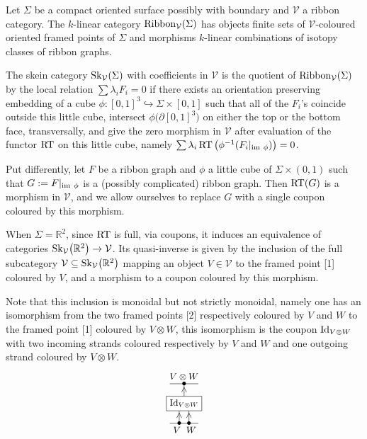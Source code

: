 \documentclass[pdftex]{sigma}%
\numberwithin{equation}{section}
\begin{document}
\begin{Definition}
Let $\Sigma$ be a compact oriented surface possibly with boundary and $\mathcal{V}$ a ribbon category. The $k$-linear category ${\rm Ribbon}_\mathcal{V}(\Sigma)$ has objects finite sets of $\mathcal{V}$-coloured oriented framed points of $\Sigma$ and morphisms $k$-linear combinations of isotopy classes of ribbon graphs.

The skein category ${\rm Sk}_\mathcal{V}(\Sigma)$ with coefficients in $\mathcal{V}$ is the quotient of ${\rm Ribbon}_\mathcal{V}(\Sigma)$ by the local relation $\sum \lambda_i F_i = 0$ if there exists an orientation preserving embedding of a cube $\phi\colon [0,1]^3 \hookrightarrow \Sigma \times [0,1]$ such that all of the $F_i$'s coincide outside this little cube, intersect $\phi\big(\partial [0,1]^3\big)$ on either the top or the bottom face, transversally, and give the zero morphism in $\mathcal{V}$ after evaluation of the functor ${\rm RT}$ on this little cube, namely $\sum \lambda_i \mathop{\rm RT}\big(\phi^{-1}(F_i\vert_{{\rm im}\ \phi})\big) = 0$.

Put differently, let $F$ be a ribbon graph and $\phi$ a little cube of $\Sigma \times (0,1)$ such that $G := F\vert_{{\rm im}\ \phi}$ is a (possibly complicated) ribbon graph. Then $\mathop{\rm RT}(G)$ is a morphism in $\mathcal{V}$, and we allow ourselves to replace $G$ with a single coupon coloured by this morphism.
\end{Definition}

\begin{Remark}\label{rmkInclVtoSkMonoid}
When $\Sigma = \mathbb{R}^2$, since ${\rm RT}$ is full, via coupons, it induces an equivalence of categories ${\rm Sk}_\mathcal{V}\big(\mathbb{R}^2\big)\to \mathcal{V}$. Its quasi-inverse is given by the inclusion of the full subcategory $\mathcal{V} \subseteq {\rm Sk}_\mathcal{V}\big(\mathbb{R}^2\big)$ mapping an object $V \in \mathcal{V}$ to the framed point [1] coloured by $V$, and a morphism to a coupon coloured by this morphism.

Note that this inclusion is monoidal but not strictly monoidal, namely one has an isomorphism from the two framed points [2] respectively coloured by $V$ and $W$ to the framed point [1] coloured by $V \otimes W$, this isomorphism is the coupon ${\rm Id}_{V \otimes W}$ with two incoming strands coloured respectively by $V$ and $W$ and one outgoing strand coloured by $V \otimes W$.
$$
\begin{tikzpicture}[yscale = 0.7, baseline = 0pt]
\draw (0,0) -- (1,0) node[pos = 0.25,below]{\small $V$} node[pos = 0.33]{\small $\bullet$} node[pos = 0.67]{\small $\bullet$} node[pos = 0.75,below]{\small $W$};
\draw (0,2) -- (1,2) node[pos = 0.5]{\small $\bullet$} node[midway,above]{\small $V \otimes W$};
\draw (0.33,0) -- ++(0,1) node[pos = 0.4, sloped]{\footnotesize $>$};
\draw (0.67,0) -- ++(0,1) node[pos = 0.4, sloped]{\footnotesize $>$};
\draw (0.5,1) -- ++(0,1) node[pos = 0.7, sloped]{\footnotesize $>$};
\node[draw, rectangle, fill=white] at (0.5,1) {\small ${\rm Id}_{V \otimes W}$};
\end{tikzpicture}
$$
\end{Remark}
\end{document}

